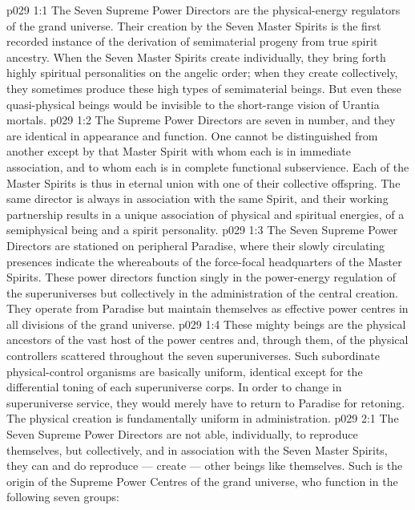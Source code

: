 \vs p029 1:1 The Seven Supreme Power Directors are the physical\hyp{}energy regulators of the grand universe. Their creation by the Seven Master Spirits is the first recorded instance of the derivation of semimaterial progeny from true spirit ancestry. When the Seven Master Spirits create individually, they bring forth highly spiritual personalities on the angelic order; when they create collectively, they sometimes produce these high types of semimaterial beings. But even these quasi\hyp{}physical beings would be invisible to the short\hyp{}range vision of Urantia mortals.
\vs p029 1:2 The Supreme Power Directors are seven in number, and they are identical in appearance and function. One cannot be distinguished from another except by that Master Spirit with whom each is in immediate association, and to whom each is in complete functional subservience. Each of the Master Spirits is thus in eternal union with one of their collective offspring. The same director is always in association with the same Spirit, and their working partnership results in a unique association of physical and spiritual energies, of a semiphysical being and a spirit personality.
\vs p029 1:3 The Seven Supreme Power Directors are stationed on peripheral Paradise, where their slowly circulating presences indicate the whereabouts of the force\hyp{}focal headquarters of the Master Spirits. These power directors function singly in the power\hyp{}energy regulation of the superuniverses but collectively in the administration of the central creation. They operate from Paradise but maintain themselves as effective power centres in all divisions of the grand universe.
\vs p029 1:4 These mighty beings are the physical ancestors of the vast host of the power centres and, through them, of the physical controllers scattered throughout the seven superuniverses. Such subordinate physical\hyp{}control organisms are basically uniform, identical except for the differential toning of each superuniverse corps. In order to change in superuniverse service, they would merely have to return to Paradise for retoning. The physical creation is fundamentally uniform in administration.
\vs p029 2:1 The Seven Supreme Power Directors are not able, individually, to reproduce themselves, but collectively, and in association with the Seven Master Spirits, they can and do reproduce --- create --- other beings like themselves. Such is the origin of the Supreme Power Centres of the grand universe, who function in the following seven groups:
